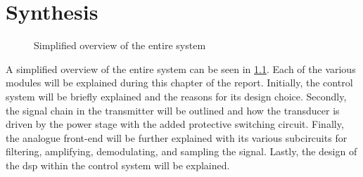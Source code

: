 \chapter{Synthesis} \label{cha:synthesis} \glsresetall
\begin{figure}[ht]
	\centering
	\resizebox{\textwidth}{!}{
		
	}
	\caption[Simplified overview of the entire system]{Simplified overview of the entire system}
	\label{fig:1_system_overview}
\end{figure}
A simplified overview of the entire system can be seen in \cref{fig:1_system_overview}. Each of the various modules will be explained during this chapter of the report. Initially, the control system will be briefly explained and the reasons for its design choice. Secondly, the signal chain in the transmitter will be outlined and how the transducer is driven by the power stage with the added protective switching circuit. Finally, the analogue front-end will be further explained with its various subcircuits for filtering, amplifying, demodulating, and sampling the signal. Lastly, the design of the \gls{dsp} within the control system will be explained.

